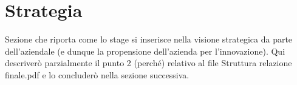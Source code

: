 \section{Strategia}%

Sezione che riporta come lo stage si inserisce nella visione strategica da parte dell'aziendale (e dunque la  propensione dell’azienda per l’innovazione).
Qui descriverò parzialmente il punto 2 (perché) relativo al file Struttura relazione finale.pdf e lo concluderò nella sezione successiva.
